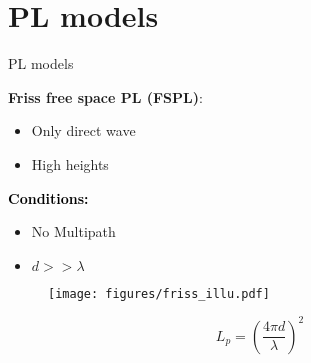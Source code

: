 \documentclass[10pt]{beamer}
\begin{document}
\section{PL models}
\begin{frame}{PL models}
\begin{minipage}{.45\textwidth}
\raggedright\textcolor{thomasblue}{\textbf{Friss free space PL (FSPL)}:}
\begin{itemize}
\item Only direct wave
\item High heights
\end{itemize} 

\vspace{1em}
\textcolor{black}{\textbf{Conditions:}}
\begin{itemize}
\item No Multipath
\item $d >> \lambda$
\end{itemize}
\end{minipage}
\begin{minipage}{0.5\textwidth}

\begin{figure}[!htbp]
 \centering
  \texttt{[image: figures/friss\_illu.pdf]}
  \end{figure}
\end{minipage}

\vspace{1em}
\begin{equation*}
L_p=\left(\frac{4 \pi d}{\lambda}\right)^2
\end{equation*}
\end{frame}
\end{document}
